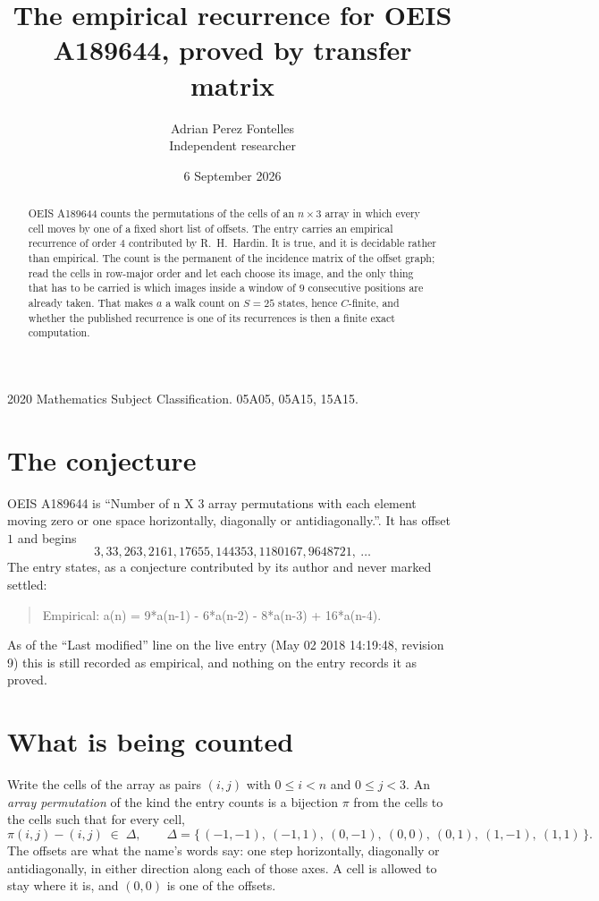 \documentclass[11pt,a4paper]{article}
\title{The empirical recurrence for OEIS A189644, proved by transfer matrix}
\author{Adrian Perez Fontelles\\ \small Independent researcher}
\date{6 September 2026}
\theoremstyle{plain}
\theoremstyle{definition}
\begin{document}
\maketitle

\begin{abstract}
OEIS A189644 counts the permutations of the cells of an $n\times3$ array in which every cell
moves by one of a fixed short list of offsets. The entry carries an empirical recurrence of
order $4$ contributed by R.~H.~Hardin. It is true, and it is decidable rather than
empirical. The count is the permanent of the incidence matrix of the offset graph; read the
cells in row-major order and let each choose its image, and the only thing that has to be
carried is which images inside a window of $9$ consecutive positions are already taken.
That makes $a$ a walk count on $S=25$ states, hence $C$-finite, and whether the published
recurrence is one of its recurrences is then a finite exact computation.
\end{abstract}

\noindent\small 2020 Mathematics Subject Classification. 05A05, 05A15, 15A15.\normalsize

\section{The conjecture}

OEIS A189644 is ``Number of n X 3 array permutations with each element moving zero or one space horizontally, diagonally or antidiagonally.''. It has offset $1$ and begins
\[
3, 33, 263, 2161, 17655, 144353, 1180167, 9648721,\ \dots
\]
The entry states, as a conjecture contributed by its author and never marked settled:
\begin{quote}
Empirical: a(n) = 9*a(n-1) - 6*a(n-2) - 8*a(n-3) + 16*a(n-4).
\end{quote}
As of the ``Last modified'' line on the live entry (May 02 2018 14:19:48, revision 9) this is still
recorded as empirical, and nothing on the entry records it as proved.

\section{What is being counted}

Write the cells of the array as pairs $(i,j)$ with $0\le i<n$ and $0\le j<3$. An
\emph{array permutation} of the kind the entry counts is a bijection $\pi$ from the cells to
the cells such that for every cell,
\[
\pi(i,j)-(i,j)\;\in\;\Delta,\qquad
\Delta=\{\,(-1,-1),\ (-1,1),\ (0,-1),\ (0,0),\ (0,1),\ (1,-1),\ (1,1)\,\}.
\]
The offsets are what the name's words say: one step horizontally, diagonally or antidiagonally, in either direction along each of those axes. A cell is allowed to stay where it is, and $(0,0)$ is one of the offsets.
\end{document}
